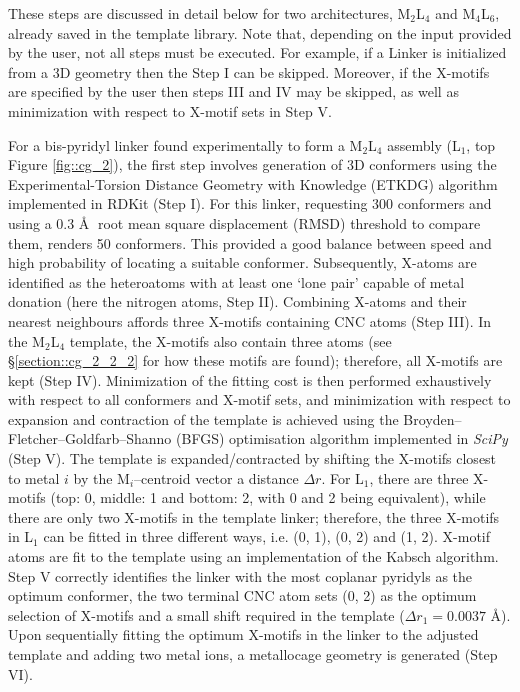 \documentclass[../../main.tex]{subfiles}
\newcommand{\MLf}{M$_2$L$_4$ }
\begin{document}
These steps are discussed in detail below for two architectures, \MLf and M$_4$L$_6$, already saved in the template library. Note that, depending on the input provided by the user, not all steps must be executed. For example, if a Linker is initialized from a 3D geometry then the Step I can be skipped. Moreover, if the X-motifs are specified by the user then steps III and IV may be skipped, as well as minimization with respect to X-motif sets in Step V.

For a bis-pyridyl linker found experimentally to form a \MLf assembly (L${}_1$, top Figure \ref{fig::cg_2}),\cite{MartCentelles2018} the first step involves generation of 3D conformers using the Experimental-Torsion Distance Geometry with Knowledge (ETKDG) algorithm\cite{Riniker2015} implemented in RDKit\cite{Landrum2019} (Step I). For this linker, requesting 300 conformers and using a 0.3 \AA$\;$ root mean square displacement (RMSD) threshold to compare them, renders 50 conformers. This provided a good balance between speed and high probability of locating a suitable conformer. Subsequently, X-atoms are identified as the heteroatoms with at least one ‘lone pair’ capable of metal donation (here the nitrogen atoms, Step II). Combining X-atoms and their nearest neighbours affords three X-motifs containing CNC atoms (Step III). In the \MLf template, the X-motifs also contain three atoms (see §\ref{section::cg_2_2_2} for how these motifs are found); therefore, all X-motifs are kept (Step IV). Minimization of the fitting cost is then performed exhaustively with respect to all conformers and X-motif sets, and minimization with respect to expansion and contraction of the template is achieved using the Broyden–Fletcher–Goldfarb–Shanno (BFGS) optimisation algorithm implemented in \emph{SciPy}\cite{SciPy} (Step V). The template is expanded/contracted by shifting the X-motifs closest to metal $i$ by the M$_i$–centroid vector a distance $\Delta r$. For L${}_1$, there are three X-motifs (top: 0, middle: 1 and bottom: 2, with 0 and 2 being equivalent), while there are only two X-motifs in the template linker; therefore, the three X-motifs in L${}_1$ can be fitted in three different ways, i.e. (0, 1), (0, 2) and (1, 2). X-motif atoms are fit to the template using an implementation of the Kabsch algorithm.\cite{Kabsch1976} Step V correctly identifies the linker with the most coplanar pyridyls as the optimum conformer, the two terminal CNC atom sets (0, 2) as the optimum selection of X-motifs and a small shift required in the template ($\Delta r_1 = 0.0037$ \AA). Upon sequentially fitting the optimum X-motifs in the linker to the adjusted template and adding two metal ions, a metallocage geometry is generated (Step VI). 
\end{document}
